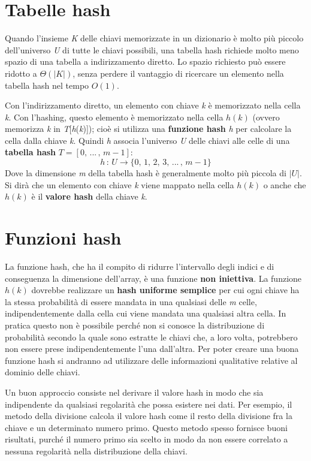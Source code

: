 \documentclass[10pt, a4paper]{report}
\begin{document}
\section{Tabelle hash}
Quando l'insieme \textit{K} delle chiavi memorizzate in un dizionario è molto più piccolo dell'universo \textit{U} di tutte le chiavi possibili, una tabella hash richiede molto meno spazio di una tabella a indirizzamento diretto. Lo spazio richiesto può essere ridotto a $\Theta(|K|)$, senza perdere il vantaggio di ricercare un elemento nella tabella hash nel tempo $O(1)$.

Con l'indirizzamento diretto, un elemento con chiave \textit{k} è memorizzato nella cella \textit{k}. Con l'hashing, questo elemento è memorizzato nella cella $h(k)$ (ovvero memorizza \textit{k} in \textit{T}[\textit{h}(\textit{k})]); cioè si utilizza una \textbf{funzione hash} \textit{h} per calcolare la cella dalla chiave \textit{k}. Quindi \textit{h} associa l'universo \textit{U} delle chiavi alle celle di una \textbf{tabella hash} $T = [0,\,...\,,\,m - 1]$:
\begin{equation*}
h \,:\, U \rightarrow \{0,\,1,\,2,\,3,\,...\,,\,m - 1\}
\end{equation*}
Dove la dimensione \textit{m} della tabella hash è generalmente molto più piccola di $|U|$. Si dirà che un elemento con chiave \textit{k} viene mappato nella cella $h(k)$ o anche che $h(k)$ è il \textbf{valore hash} della chiave \textit{k}.
\section{Funzioni hash}
La funzione hash, che ha il compito di ridurre l'intervallo degli indici e di conseguenza la dimensione dell'array, è una funzione \textbf{non iniettiva}. La funzione $h(k)$ dovrebbe realizzare un \textbf{hash uniforme semplice} per cui ogni chiave ha la stessa probabilità di essere mandata in una qualsiasi delle \textit{m} celle, indipendentemente dalla cella cui viene mandata una qualsiasi altra cella. In pratica questo non è possibile perché non si conosce la distribuzione di probabilità secondo la quale sono estratte le chiavi che, a loro volta, potrebbero non essere prese indipendentemente l'una dall'altra. Per poter creare una buona funzione hash si andranno ad utilizzare delle informazioni qualitative relative al dominio delle chiavi.

Un buon approccio consiste nel derivare il valore hash in modo che sia indipendente da qualsiasi regolarità che possa esistere nei dati. Per esempio, il metodo della divisione calcola il valore hash come il resto della divisione fra la chiave e un determinato numero primo. Questo metodo spesso fornisce buoni risultati, purché il numero primo sia scelto in modo da non essere correlato a nessuna regolarità nella distribuzione della chiavi.
\end{document}
